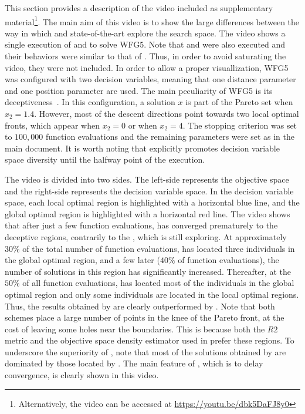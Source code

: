 This section provides a description of the video included as supplementary material\footnote{Alternatively, the video can be accessed 
at \url{https://youtu.be/dbk5DaFJ8y0}}.
%
The main aim of this video is to show the large differences between the way in which \VSDMOEA{} and state-of-the-art \MOEAS{} 
explore the search space.
%
The video shows a single execution of \VSDMOEA{} and \RMOEA{} to solve WFG5.
%
Note that \NSGAII{} and \MOEAD{} were also executed and their behaviors were similar to that of \RMOEA{}.
%
Thus, in order to avoid saturating the video, they were not included.
%
In order to allow a proper visuallization, WFG5 was configured with two decision variables, meaning that one distance parameter
and one position parameter are used.
%
The main peculiarity of WFG5 is its deceptiveness~\cite{Joel:WFG}.
%
In this configuration, a solution $x$ is part of the Pareto set when $x_2 = 1.4$.
%
However, most of the descent directions point towards two local optimal fronts, which appear when $x_2 = 0$ or when $x_2 = 4$.
%
The stopping criterion was set to $100,000$ function evaluations and the remaining parameters were set as in the main document.
%
It is worth noting that \VSDMOEA{} explicitly promotes decision variable space diversity until the halfway point of the execution.

The video is divided into two sides.
%
The left-side represents the objective space and the right-side represents the decision variable space.
%
In the decision variable space, each local optimal region is highlighted with a horizontal blue line, and the global optimal region is highlighted 
with a horizontal red line.
%
The video shows that after just a few function evaluations, \RMOEA{} has converged prematurely to the deceptive regions, 
contrarily to the \VSDMOEA{}, which is still exploring.
%
At approximately $30\%$ of the total number of function evaluations, \VSDMOEA{} has 
located three individuals in the global optimal region, and a few later ($40\%$ of function evaluations),
the number of solutions in this region has significantly increased.
%
Thereafter, at the $50\%$ of all function evaluations, \VSDMOEA{} has located most of the individuals in the global optimal region and only 
some individuals are located in the local optimal regions.
%
Thus, the results obtained by \RMOEA{} are clearly outperformed by \VSDMOEA{}.
%
Note that both schemes place a large number of points in the knee of the Pareto front, at the cost of leaving some holes near the boundaries.
%
This is because both the $R2$ metric and the objective space density estimator used in \VSDMOEA{} prefer these regions.
%
To underscore the superiority of \VSDMOEA{}, note that most of the solutions obtained by \RMOEA{} are dominated by those 
located by \VSDMOEA{}.
%
The main feature of \VSDMOEA{}, which is to delay convergence, is clearly shown in this video.

